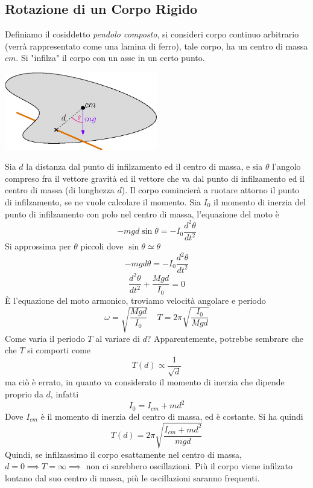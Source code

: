 \documentclass[10pt, letterpaper]{report}
\begin{document}
\subsection{Rotazione di un Corpo Rigido}
Definiamo il cosiddetto \textit{pendolo composto}, si consideri corpo continuo arbitrario (verrà rappresentato 
come una lamina di ferro), tale corpo, ha un centro di massa $cm$. Si "infilza" il corpo con un asse in un 
certo punto.\begin{center}
    \includegraphics[width=0.5\textwidth ]{images/pendoloComposto.eps}
\end{center}
Sia $d$ la distanza dal punto di infilzamento ed il centro di massa, e sia $\theta$ l'angolo compreso fra il vettore gravità ed il vettore che va dal punto di infilzamento ed il centro di massa (di lunghezza $d$). Il corpo comincierà a ruotare attorno il punto di infilzamento, se ne vuole calcolare il momento. 
Sia $I_0$ il momento di inerzia del punto di infilzamento con polo nel centro di massa, l'equazione del moto 
è 
$$-mgd\sin\theta=-I_0\dfrac{d^2\theta}{dt^2}$$
Si approssima per $\theta$ piccoli dove $\sin\theta\simeq \theta$
$$ -mgd\theta=-I_0\dfrac{d^2\theta}{dt^2}$$
$$\dfrac{d^2\theta}{dt^2}+\frac{Mgd}{I_0}=0$$
È l'equazione del moto armonico, troviamo velocità angolare e periodo 
$$\omega = \sqrt{\frac{Mgd}{I_0}}  \ \ \ \ \ T=2\pi\sqrt{\frac{I_0}{Mgd}}$$
Come varia il periodo $T$ al variare di $d$? Apparentemente, potrebbe sembrare che che $T$ si comporti come 
$$ T(d)\propto \frac{1}{\sqrt{d}}$$
ma ciò è errato, in quanto va considerato il momento di inerzia che dipende proprio da $d$, infatti 
$$ I_0=I_{cm}+md^2$$
Dove $I_{cm}$ è il momento di inerzia del centro di massa, ed è costante. Si ha quindi 
$$ T(d)=2\pi\sqrt{\frac{I_{cm}+md^2}{mgd}}$$
Quindi, se infilzassimo il corpo esattamente nel centro di massa, $d=0\implies T=\infty \implies$ non ci sarebbero oscillazioni. Più il corpo viene infilzato lontano dal suo centro di massa, più le oscillazioni 
saranno frequenti.\begin{center}
\end{center}
\flowerLine
\end{document}
